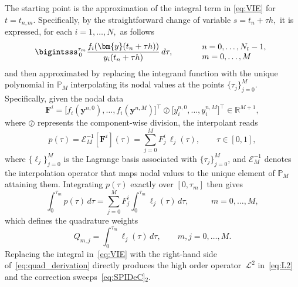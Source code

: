 \documentclass[a4paper,num-refs]{oup-contemporary-spidec}
\begin{document}
The starting point is the approximation of the integral term in \eqref{eq:VIE} for $t=t_{n,m}$. Specifically, by the straightforward change of variable $s=t_n+\tau h,$ it is expressed, for each $i=1,\dots,N,$ as follows
\begin{equation*}
    \bigintsss_{\, 0}^{\tau_m}
    \dfrac{f_i(\bm{y}(t_n+\tau h))}{y_i(t_n+\tau h)}\, d\tau, \qquad  \quad \begin{array}{l}
         n=0,\dots,N_t-1,  \\
         m=0,\dots,M 
    \end{array}
\end{equation*}
and then approximated by replacing the integrand function with the unique polynomial in $\mathbb{P}_M$ interpolating its nodal values at the points $\{\tau_j\}_{j=0}^M$. Specifically, given the nodal data
\begin{equation*}
    \bm{F}^i
    =\bigl[f_i(\bm{y}^{n,0}),\dots,f_i(\bm{y}^{n,M})\bigr]^\top
     \oslash
     \bigl[y_i^{n,0},\dots,y_i^{n,M}\bigr]^\top
    \in\mathbb{R}^{M+1},
\end{equation*}
where $\oslash$ represents the component-wise division, the interpolant reads
\begin{equation*}
    p(\tau)
    = \mathcal{E}_M^{-1}[\bm{F}^i](\tau)
    = \sum_{j=0}^M F^i_j\,\ell_j(\tau),
    \qquad \tau\in[0,1],
\end{equation*}
where $\{\ell_j\}_{j=0}^M$ is the Lagrange basis associated with $\{\tau_j\}_{j=0}^M$, and $\mathcal{E}_M^{-1}$ denotes the interpolation operator that maps nodal values to the unique element of $\mathbb{P}_M$ attaining them. Integrating $p(\tau)$ exactly over $[0,\tau_m]$ then gives
\begin{equation}\label{eq:quad_derivation}
    \int_0^{\tau_m} p(\tau)\,d\tau
    = \sum_{j=0}^M F^i_j
      \int_0^{\tau_m}\ell_j(\tau)\,d\tau,
    \qquad \ \ \  m=0,\dots,M,
\end{equation}
which defines the quadrature weights
\begin{equation}\label{eq:forma_pesi}
    Q_{m,j} = \int_0^{\tau_m}\ell_j(\tau)\,d\tau,
    \qquad m,j=0,\dots,M.
\end{equation}
Replacing the integral in~\eqref{eq:VIE} with the right-hand side of~\eqref{eq:quad_derivation} directly produces the high order operator~$\bm{\mathcal{L}}^2$ in~\eqref{eq:L2} and the correction sweeps~\eqref{eq:SPIDeC}$_2$.
\end{document}
